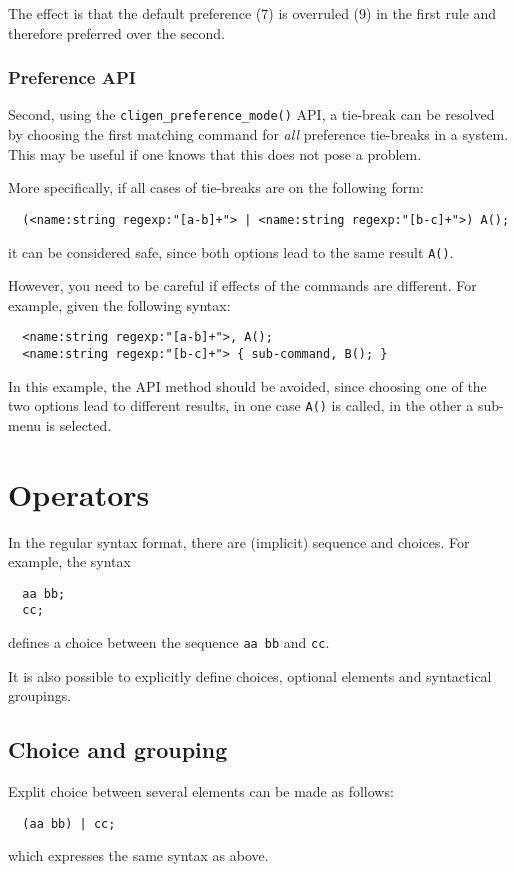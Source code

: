 \documentclass[a4paper, 10pt] {article}
\begin{document}
The effect is that the default preference ($7$) is overruled ($9$) in the first rule and therefore preferred over the second.

\subsubsection{Preference API}

Second, using the {\tt cligen\_preference\_mode()} API, a tie-break can be
resolved by choosing the first matching command for {\em all}
preference tie-breaks in a system. This may be useful if one knows
that this does not pose a problem.

More specifically, if all cases of tie-breaks are on the following form:
\begin{verbatim}
  (<name:string regexp:"[a-b]+"> | <name:string regexp:"[b-c]+">) A();
\end{verbatim}

it can be considered safe, since both options lead to the same result {\tt A()}.

However, you need to be careful if effects of the commands are different. For example, given the following syntax:
\begin{verbatim}
  <name:string regexp:"[a-b]+">, A();
  <name:string regexp:"[b-c]+"> { sub-command, B(); }
\end{verbatim}

In this example, the API method should be avoided, since choosing one of the two 
options lead to different results, in one case {\tt A()} is called, in the other a sub-menu is selected.

\section{Operators}
\label{sec:operators}

In the regular syntax format, there are (implicit) sequence and choices. For example, the syntax
\begin{verbatim}
  aa bb;
  cc;
\end{verbatim}
defines a choice between the sequence {\tt aa bb} and {\tt cc}.

It is also possible to explicitly define choices, optional elements and syntactical groupings.

\subsection{Choice and grouping}
Explit choice between several elements can be made as follows:
\begin{verbatim}
  (aa bb) | cc;
\end{verbatim}
which expresses the same syntax as above.
\end{document}
